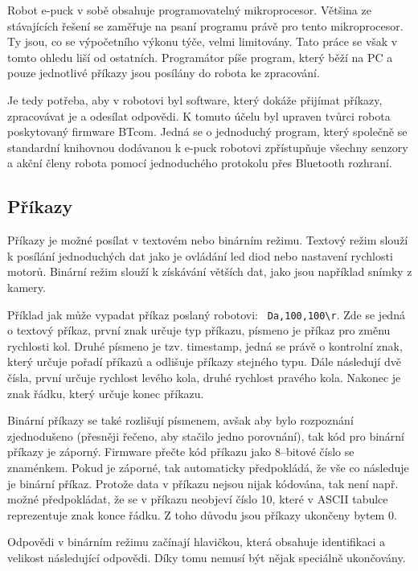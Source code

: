 \documentclass[12pt,notitlepage]{report}
\begin{document}
    Robot e-puck v sobě obsahuje programovatelný mikroprocesor. Většina ze
    stávajících řešení se zaměřuje na psaní programu právě pro tento
    mikroprocesor. Ty jsou, co se výpočetního výkonu týče, velmi limitovány.
    Tato práce se však v tomto ohledu liší od ostatních. Programátor píše
    program, který běží na PC a pouze jednotlivé příkazy jsou posílány do
    robota ke zpracování.

    Je tedy potřeba, aby v robotovi byl software, který dokáže přijímat
    příkazy, zpracovávat je a odesílat odpovědi. K tomuto účelu byl upraven
    tvůrci robota poskytovaný firmware BTcom. Jedná se o jednoduchý program,
    který společně se standardní knihovnou dodávanou k e-puck robotovi
    zpřístupňuje všechny senzory a akční členy robota pomocí jednoduchého
    protokolu přes Bluetooth rozhraní.

    \subsection{Příkazy}
    \label{btcom:prikazy}

    Příkazy je možné posílat v textovém nebo binárním režimu. Textový režim
    slouží k posílání jednoduchých dat jako je ovládání led diod nebo nastavení
    rychlosti motorů. Binární režim slouží k získávání větších dat, jako jsou
    například snímky z kamery.

    Příklad jak může vypadat příkaz poslaný robotovi: {\tt
    Da,100,100\textbackslash r}. Zde se jedná o textový příkaz, první znak
    určuje typ příkazu, písmeno  je příkaz pro změnu rychlosti kol. Druhé
    písmeno je tzv. timestamp, jedná se právě o kontrolní znak, který určuje
    pořadí příkazů a odlišuje příkazy stejného typu. Dále následují dvě čísla,
    první určuje rychlost levého kola, druhé rychlost pravého kola. Nakonec je
    znak řádku, který určuje konec příkazu.

    Binární příkazy se také rozlišují písmenem, avšak aby bylo rozpoznání
    zjednodušeno (přesněji řečeno, aby stačilo jedno porovnání), tak kód pro
    binární příkazy je záporný. Firmware přečte kód příkazu jako 8--bitové
    číslo se znaménkem. Pokud je záporné, tak automaticky předpokládá, že vše
    co následuje je binární příkaz. Protože data v příkazu nejsou nijak
    kódována, tak není např. možné předpokládat, že se v příkazu neobjeví číslo
    10, které v ASCII tabulce reprezentuje znak konce řádku. Z toho důvodu jsou
    příkazy ukončeny bytem 0.

    Odpovědi v binárním režimu začínají hlavičkou, která obsahuje identifikaci
    a velikost následující odpovědi. Díky tomu nemusí být nějak speciálně
    ukončovány.
\end{document}
